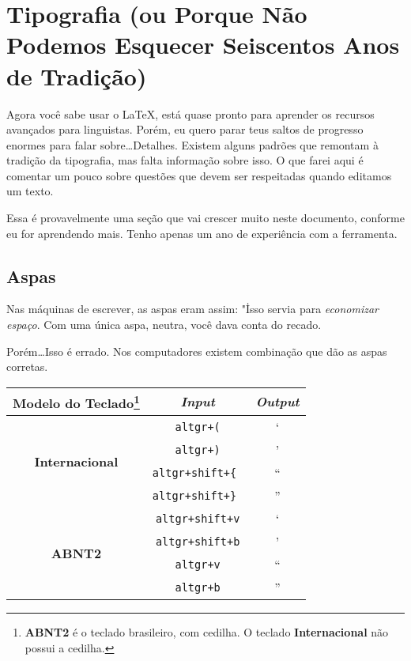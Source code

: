 \chapter{Tipografia (ou Porque Não Podemos Esquecer Seiscentos Anos de Tradição)}

Agora você sabe usar o \LaTeX{}, está quase pronto para aprender os recursos avançados para linguistas. Porém, eu quero parar teus saltos de progresso enormes para falar sobre\ldots Detalhes. Existem alguns padrões que remontam à tradição da tipografia, mas falta informação sobre isso. O que farei aqui é comentar um pouco sobre questões que devem ser respeitadas quando editamos um texto.

Essa é provavelmente uma seção que vai crescer muito neste documento, conforme eu for aprendendo mais. Tenho apenas um ano de experiência com a ferramenta.

\section{Aspas}

Nas máquinas de escrever, as aspas eram assim: "\. Isso servia para \emph{economizar espaço}. Com uma única aspa, neutra, você dava conta do recado.

Porém\ldots Isso é errado. Nos computadores existem combinação que dão as aspas corretas.

\begin{center}
\begin{tabular}{c c c}
\bf Modelo do Teclado\footnote{\textbf{ABNT2} é o teclado brasileiro, com cedilha. O teclado \textbf{Internacional} não possui a cedilha.} & \bf \emph{Input} & \bf \emph{Output} \\
\hline
\multirow{4}{*}{\bf Internacional}	& \texttt{altgr+(} & ‘ \\
					& \texttt{altgr+)} & ’ \\
					& \texttt{altgr+shift+\{ } & “ \\
					& \texttt{altgr+shift+\} } & ” \\
\hline
\multirow{4}{*}{\bf ABNT2}		& \texttt{altgr+shift+v}  & ‘ \\
					& \texttt{altgr+shift+b}  & ’ \\
					& \texttt{altgr+v} & “ \\
					& \texttt{altgr+b} & ” \\
\end{tabular}
\end{center}

